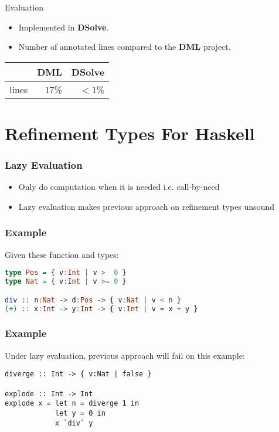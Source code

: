 \documentclass[pdf]{beamer}
\begin{document}
\begin{frame}{Evaluation}
  \begin{itemize}
    \item Implemented in \textbf{DSolve}.
    \item Number of annotated lines compared to the \textbf{DML} project.
  \end{itemize}
  \begin{table}
    \begin{tabular}{l|r|r}
            & \textbf{DML} & \textbf{DSolve}\\
      \hline
      lines & 17\%         & $< 1$\%
    \end{tabular}
  \end{table}
\end{frame}

\section{Refinement Types For Haskell}

\begin{frame}
  \frametitle{Lazy Evaluation}
  \begin{itemize}
    \item Only do computation when it is needed i.e. call-by-need
    \item Lazy evaluation makes previous approach on refinement types unsound
  \end{itemize}
\end{frame}

\begin{frame}[fragile]
  \frametitle{Example}
  Given these function and types:
  \begin{lstlisting}[language=haskell]
type Pos = { v:Int | v >  0 }
type Nat = { v:Int | v >= 0 }

div :: n:Nat -> d:Pos -> { v:Nat | v < n } 
(+) :: x:Int -> y:Int -> { v:Int | v = x + y }
  \end{lstlisting}
\end{frame}

\begin{frame}[fragile]
  \frametitle{Example}
  Under lazy evaluation, previous approach will fail on this example:
  \begin{verbatim}
diverge :: Int -> { v:Nat | false } 

explode :: Int -> Int
explode x = let n = diverge 1 in 
            let y = 0 in 
            x `div` y
  \end{verbatim}
\end{frame}
\end{document}

